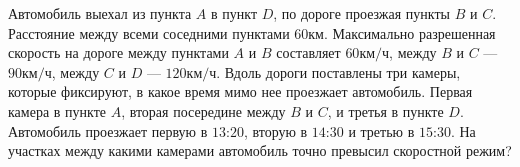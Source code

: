 Автомобиль выехал из пункта $A$ в пункт $D$, по дороге проезжая пункты $B$ и $C$. Расстояние между всеми соседними пунктами $60\unit{км}$. Максимально разрешенная скорость на дороге между пунктами $A$ и $B$ составляет $60\unit{км/ч}$, между $B$ и $C$ --- $90\unit{км/ч}$, между $C$ и $D$ --- $120\unit{км/ч}$. Вдоль дороги поставлены три камеры, которые фиксируют, в какое время мимо нее проезжает автомобиль. Первая камера в пункте $A$, вторая посередине между $B$ и $C$, и третья в пункте $D$. Автомобиль проезжает первую в $13$:$20$, вторую в $14$:$30$ и третью в $15$:$30$. На участках между какими камерами автомобиль точно превысил скоростной режим?